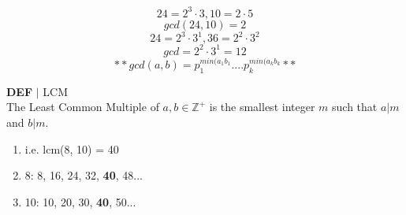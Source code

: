 \documentclass [12pt]{article}
\begin{document}
\[24=2^3\cdot3, 10=2\cdot 5\]
\[gcd(24,10)=2\]
\[24 = 2^3\cdot3^1, 36 = 2^2\cdot3^2\]
\[gcd = 2^2\cdot 3^1 = 12\]
\[** gcd (a,b) = p_1^{min(a_1b_1}....p_k^{min(a_kb_k}**\]
\vspace{0.2in}
\begin{framed}
\noindent\textbf{DEF} $|$ LCM\\
The Least Common Multiple of $a,b\in\mathbb{Z^+}$ is the smallest integer $m$ such that $a|m$ and $b|m$.
\begin{enumerate}[\quad]
    \item  i.e. lcm(8, 10) = 40
    \item 8: 8, 16, 24, 32, \textbf{40}, 48...
    \item 10: 10, 20, 30, \textbf{40}, 50...
\end{enumerate}

\end{framed}
\end{document}
